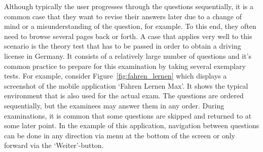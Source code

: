 \documentclass{sig-alternate-05-2015}
\begin{document}
Although typically the user progresses through the questions sequentially, it is a
common case that they want to revise their answers later due to a change of
mind or a misunderstanding of the question, for example. To this end, they often need to browse several pages back or forth. A case that applies very
well to this scenario is the theory test that has to be passed in order to obtain
a driving license in Germany. It consists of a relatively large number of questions and it's common 
practice to prepare for this examination by taking several exemplary tests. For example, consider Figure~\ref{fig:fahren_lernen} which displays a screenshot of the
mobile application `Fahren Lernen Max'. It shows the typical environment that
is also used for the actual exam. The questions are ordered sequentially, but the examinees
may answer them in any order. During examinations, it is common that some questions are
skipped and returned to at some later point.
In the example of this application, navigation between questions can be done in any direction via menu at the bottom of the screen or only forward via the `Weiter'-button.
\end{document}
